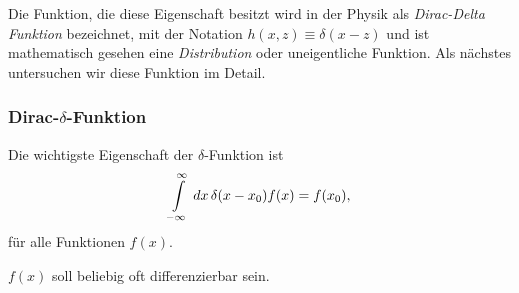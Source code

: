 Die Funktion, die diese Eigenschaft besitzt wird in der Physik als {\em
Dirac-Delta Funktion} bezeichnet, mit der Notation $h(x,z)\equiv \delta(x-z)$
und ist mathematisch gesehen eine {\em Distribution} oder uneigentliche
Funktion. Als nächstes untersuchen wir diese Funktion im Detail.

\subsubsection{Dirac-$\delta$-Funktion}

Die wichtigste Eigenschaft der $\delta$-Funktion ist
\begin{align}
\int \limits_{-\infty}^{\infty} \,dx\, \delta(x-x_0) f(x) = f(x_0),
\end{align}
für alle Funktionen $f(x)$.
\begin{info}
$f(x)$ soll beliebig oft differenzierbar sein.
\end{info}

